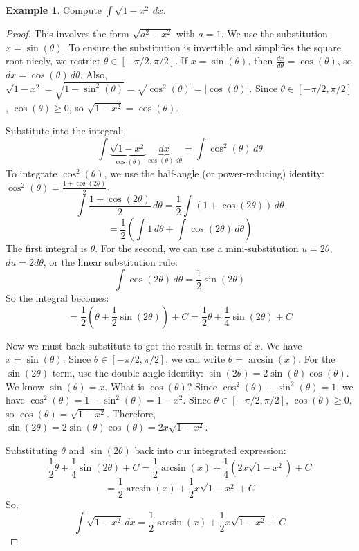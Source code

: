 \documentclass[11pt]{article}
\theoremstyle{definition}
\newtheorem{example}[theorem]{Example}
\theoremstyle{remark}
\begin{document}
\begin{example}
Compute $\int \sqrt{1-x^2} \, dx$.
\begin{proof}
This involves the form $\sqrt{a^2-x^2}$ with $a=1$. We use the substitution $x = \sin(\theta)$.
To ensure the substitution is invertible and simplifies the square root nicely, we restrict $\theta \in [-\pi/2, \pi/2]$.
If $x = \sin(\theta)$, then $\frac{dx}{d\theta} = \cos(\theta)$, so $dx = \cos(\theta) \, d\theta$.
Also, $\sqrt{1-x^2} = \sqrt{1-\sin^2(\theta)} = \sqrt{\cos^2(\theta)} = |\cos(\theta)|$. Since $\theta \in [-\pi/2, \pi/2]$, $\cos(\theta) \ge 0$, so $\sqrt{1-x^2} = \cos(\theta)$.

Substitute into the integral:
\[ \int \underbrace{\sqrt{1-x^2}}_{\cos(\theta)} \underbrace{dx}_{\cos(\theta) \, d\theta} = \int \cos^2(\theta) \, d\theta \]
To integrate $\cos^2(\theta)$, we use the half-angle (or power-reducing) identity: $\cos^2(\theta) = \frac{1+\cos(2\theta)}{2}$.
\[ \int \frac{1+\cos(2\theta)}{2} \, d\theta = \frac{1}{2} \int (1+\cos(2\theta)) \, d\theta \]
\[ = \frac{1}{2} \left( \int 1 \, d\theta + \int \cos(2\theta) \, d\theta \right) \]
The first integral is $\theta$. For the second, we can use a mini-substitution $u=2\theta$, $du=2d\theta$, or the linear substitution rule:
\[ \int \cos(2\theta) \, d\theta = \frac{1}{2} \sin(2\theta) \]
So the integral becomes:
\[ = \frac{1}{2} \left( \theta + \frac{1}{2} \sin(2\theta) \right) + C = \frac{1}{2}\theta + \frac{1}{4}\sin(2\theta) + C \]

Now we must back-substitute to get the result in terms of $x$.
We have $x = \sin(\theta)$. Since $\theta \in [-\pi/2, \pi/2]$, we can write $\theta = \arcsin(x)$.
For the $\sin(2\theta)$ term, use the double-angle identity: $\sin(2\theta) = 2\sin(\theta)\cos(\theta)$.
We know $\sin(\theta) = x$.
What is $\cos(\theta)$? Since $\cos^2(\theta) + \sin^2(\theta) = 1$, we have $\cos^2(\theta) = 1 - \sin^2(\theta) = 1 - x^2$. Since $\theta \in [-\pi/2, \pi/2]$, $\cos(\theta) \ge 0$, so $\cos(\theta) = \sqrt{1-x^2}$.
Therefore, $\sin(2\theta) = 2 \sin(\theta) \cos(\theta) = 2x\sqrt{1-x^2}$.

Substituting $\theta$ and $\sin(2\theta)$ back into our integrated expression:
\[ \frac{1}{2}\theta + \frac{1}{4}\sin(2\theta) + C = \frac{1}{2} \arcsin(x) + \frac{1}{4} (2x\sqrt{1-x^2}) + C \]
\[ = \frac{1}{2} \arcsin(x) + \frac{1}{2} x\sqrt{1-x^2} + C \]
So,
\[ \int \sqrt{1-x^2} \, dx = \frac{1}{2} \arcsin(x) + \frac{1}{2} x\sqrt{1-x^2} + C \]
\end{proof}
\end{example}
\end{document}
